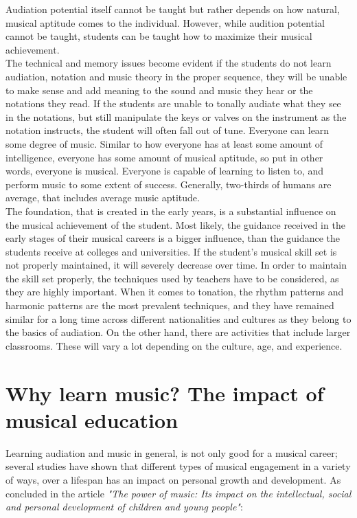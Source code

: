 Audiation potential itself cannot be taught but rather depends on how natural, musical aptitude comes to the individual. However, while audition potential cannot be taught, students can be taught how to maximize their musical achievement\cite{audiation}.\\

The technical and memory issues become evident if the students do not learn audiation, notation and music theory in the proper sequence, they will be unable to make sense and add meaning to the sound and music they hear or the notations they read. If the students are unable to tonally audiate what they see in the notations, but still manipulate the keys or valves on the instrument as the notation instructs, the student will often fall out of tune.
Everyone can learn some degree of music. Similar to how everyone has at least some amount of intelligence, everyone has some amount of musical aptitude, so put in other words, everyone is musical\cite{audiation}. Everyone is capable of learning to listen to, and perform music to some extent of success\cite{audiation}. Generally, two-thirds of humans are average, that includes average music aptitude\cite{audiation}.\\

The foundation, that is created in the early years, is a substantial influence on the musical achievement of the student. Most likely, the guidance received in the early stages of their musical careers is a bigger influence, than the guidance the students receive at colleges and universities\cite{audiation}. If the student's musical skill set is not properly maintained, it will severely decrease over time\cite{audiation}.
In order to maintain the skill set properly, the techniques used by teachers have to be considered, as they are highly important\cite{audiation}. When it comes to tonation, the rhythm patterns and harmonic patterns are the most prevalent techniques, and they have remained similar for a long time across different nationalities and cultures as they belong to the basics of audiation. On the other hand, there are activities that include larger classrooms. These will vary a lot depending on the culture, age, and experience\cite{audiation}.\\


\section{Why learn music? The impact of musical education}
Learning audiation and music in general, is not only good for a musical career; several studies have shown that different types of musical engagement in a variety of ways, over a lifespan has an impact on personal growth and development. As concluded in the article \textit{"The power of music: Its impact on the intellectual, social and personal development of children and young people"}:\\

